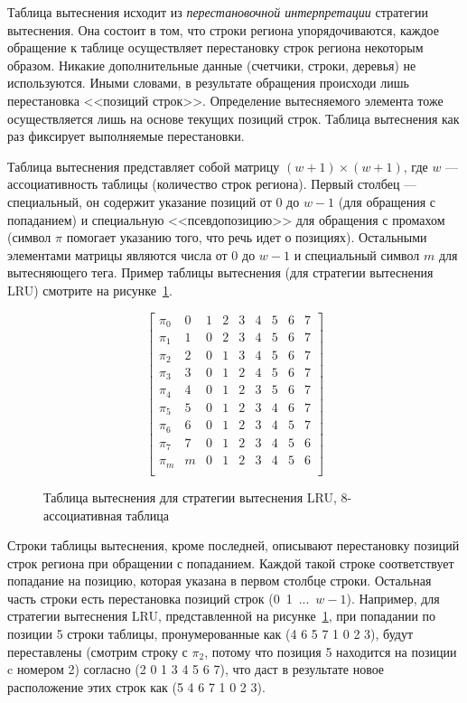 \documentclass[14pt]{extreport}
\newcommand{\LRU}{\textsf{LRU}\xspace}
\begin{document}
Таблица вытеснения исходит из \emph{перестановочной интерпретации} стратегии
вытеснения. Она состоит в том, что строки региона упорядочиваются, каждое
обращение к таблице осуществляет перестановку строк региона некоторым образом.
Никакие дополнительные данные (счетчики, строки, деревья) не используются. Иными
словами, в результате обращения происходи лишь перестановка <<позиций строк>>.
Определение вытесняемого элемента тоже осуществляется лишь на основе текущих
позиций строк. Таблица вытеснения как раз фиксирует выполняемые перестановки.

Таблица вытеснения представляет собой матрицу $(w{+}1) \times (w{+}1)$, где $w$
--- ассоциативность таблицы (количество строк региона). Первый столбец ---
специальный, он содержит указание позиций от 0 до $w{-}1$ (для обращения с
попаданием) и
специальную <<псевдопозицию>> для обращения с промахом (символ $\pi$ помогает
указанию того, что речь идет о позициях). Остальными элементами
матрицы являются числа от 0 до $w{-}1$ и специальный символ $m$ для
вытесняющего тега. Пример таблицы вытеснения (для стратегии
вытеснения \LRU) смотрите на рисунке~\ref{fig:PolicyTableLRU8}.

\begin{figure}[h]
$$ \left[
     \begin{array}{c|cccccccc}
       \pi_0 & 0 & 1 & 2 & 3 & 4 & 5 & 6 & 7 \\
       \pi_1 & 1 & 0 & 2 & 3 & 4 & 5 & 6 & 7 \\
       \pi_2 & 2 & 0 & 1 & 3 & 4 & 5 & 6 & 7 \\
       \pi_3 & 3 & 0 & 1 & 2 & 4 & 5 & 6 & 7 \\
       \pi_4 & 4 & 0 & 1 & 2 & 3 & 5 & 6 & 7 \\
       \pi_5 & 5 & 0 & 1 & 2 & 3 & 4 & 6 & 7 \\
       \pi_6 & 6 & 0 & 1 & 2 & 3 & 4 & 5 & 7 \\
       \pi_7 & 7 & 0 & 1 & 2 & 3 & 4 & 5 & 6 \\
       \pi_m & m & 0 & 1 & 2 & 3 & 4 & 5 & 6 \\
     \end{array}
   \right]
$$
\caption{Таблица вытеснения для стратегии вытеснения \LRU,
8-ассоциативная таблица}\label{fig:PolicyTableLRU8}
\end{figure}

Строки таблицы вытеснения, кроме последней, описывают перестановку позиций строк
региона при обращении с попаданием. Каждой такой строке соответствует попадание
на позицию, которая указана в первом столбце строки. Остальная часть строки есть
перестановка позиций строк (0~1~...~$w{-}1$). Например, для стратегии вытеснения
\LRU,
представленной на рисунке~\ref{fig:PolicyTableLRU8}, при попадании по позиции 5
строки таблицы, пронумерованные как (4 6 5 7 1 0 2 3), будут переставлены
(смотрим строку с $\pi_2$, потому что позиция 5 находится на позиции c номером
2) согласно (2 0 1 3 4 5 6 7), что даст в результате новое расположение этих
строк как (5 4 6 7 1 0 2 3).
\end{document}
